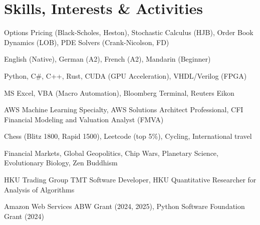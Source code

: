 \documentclass[letterpaper,11.9pt]{article}
\begin{document}
\section{Skills, Interests \& Activities}
\vspace{-4pt}
\begin{description}[leftmargin=0em, itemsep=-2pt]
    \item[Research:] Options Pricing (Black-Scholes, Heston), Stochastic Calculus (HJB), Order Book Dynamics (LOB),  PDE Solvers (Crank-Nicolson, FD)
      \item[Languages:] English (Native), German (A2), French (A2), Mandarin (Beginner)
      \item[Programming:] Python, C\#, C++, Rust, CUDA (GPU Acceleration), VHDL/Verilog (FPGA)
      \item[Tools:] MS Excel, VBA (Macro Automation), Bloomberg Terminal, Reuters Eikon
      \item[Certifications:] AWS Machine Learning Specialty, AWS Solutions Architect Professional, CFI Financial Modeling and Valuation Analyst (FMVA)
  \item[Extra Curricular:] Chess (Blitz 1800, Rapid 1500), Leetcode (top 5\%), Cycling, International travel\\
    \item[Self Readings :] Financial Markets, Global Geopolitics, Chip Wars, Planetary Science, Evolutionary Biology, Zen Buddhism\\
    \item[Campus Involvement:] HKU Trading Group TMT Software Developer, HKU Quantitative Researcher for Analysis of Algorithms
    \item[Awards:] Amazon Web Services ABW Grant (2024, 2025), Python Software Foundation Grant (2024)

    \end{description}
\end{document}
